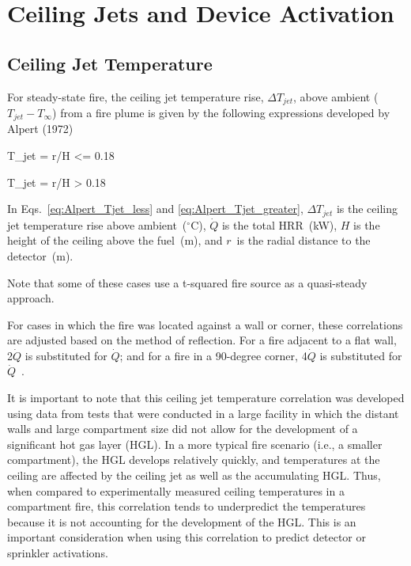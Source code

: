 \chapter{Ceiling Jets and Device Activation}
\label{Ceiling_Jet_Chapter}

\section{Ceiling Jet Temperature}

For steady-state fire, the ceiling jet temperature rise, $\Delta T_{jet}$, above ambient ($T_{jet} - T_\infty$) from a fire plume is given by the following expressions developed by Alpert (1972)

\be
\Delta T_{jet} =   r/H <= 0.18
\label{eq:Alpert_Tjet_less}
\ee

\be
\Delta T_{jet} =   r/H > 0.18
\label{eq:Alpert_Tjet_greater}
\ee

In Eqs.~\ref{eq:Alpert_Tjet_less} and \ref{eq:Alpert_Tjet_greater}, $\Delta T_{jet}$ is the ceiling jet temperature rise above ambient~($^\circ$C), $\dot Q$ is the total HRR~(kW), $H$ is the height of the ceiling above the fuel~(m), and $r$~is the radial distance to the detector~(m).

Note that some of these cases use a t-squared fire source as a quasi-steady approach.

For cases in which the fire was located against a wall or corner, these correlations are adjusted based on the method of reflection. For a fire adjacent to a flat wall, 2$\dot Q$ is substituted for $\dot Q$; and for a fire in a 90-degree corner, 4$\dot Q$ is substituted for $\dot Q$~\cite{SFPE:Alpert}.

It is important to note that this ceiling jet temperature correlation was developed using data from tests that were conducted in a large facility in which the distant walls and large compartment size did not allow for the development of a significant hot gas layer (HGL). In a more typical fire scenario (i.e., a smaller compartment), the HGL develops relatively quickly, and temperatures at the ceiling are affected by the ceiling jet as well as the accumulating HGL. Thus, when compared to experimentally measured ceiling temperatures in a compartment fire, this correlation tends to underpredict the temperatures because it is not accounting for the development of the HGL. This is an important consideration when using this correlation to predict detector or sprinkler activations.

